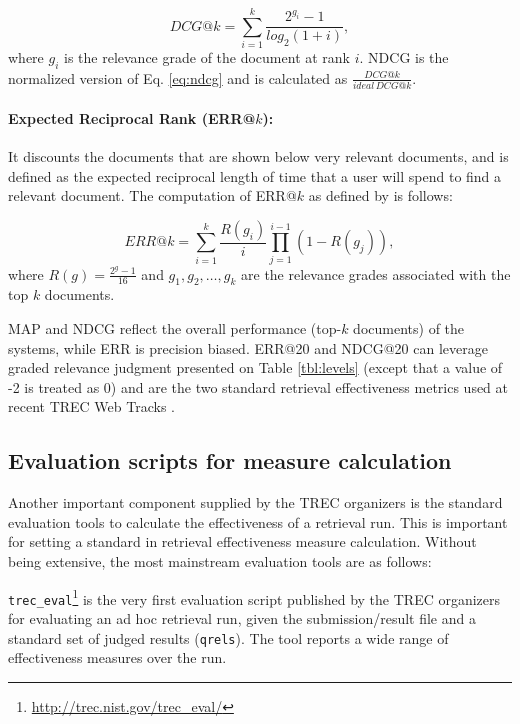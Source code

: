 \begin{equation} \label{eq:ndcg}
DCG@k = \sum\limits_{i=1}^k \frac{2^{g_i}-1}{log_2(1+i)},
\end{equation}
where $g_i$ is the relevance grade of the document at rank $i$.
NDCG is the normalized version of Eq. \ref{eq:ndcg} and is calculated as $\frac{DCG@k} {ideal \, DCG@k} $.

\paragraph{Expected Reciprocal Rank (ERR@$k$):} It discounts the documents that are shown below very relevant documents, and is defined as the expected reciprocal length of time that a user will spend to find a relevant document.
The computation of ERR@$k$ as defined by \citet*{err} is follows:
  
\begin{equation} \label{eq:err}
ERR@k = \sum\limits_{i=1}^k \frac{R(g_i)} {i} \prod\limits_{j=1}^{i-1}{(1-R(g_j))},
\end{equation}
where $R(g)=\frac{2^g-1}{16}$ and $g_1,g_2,\ldots,g_k$ are the relevance grades associated with the top $k$ documents.

MAP and NDCG reflect the overall performance (top-$k$ documents) of the systems, while ERR is precision biased.
ERR@20 and NDCG@20 can leverage graded relevance judgment presented on Table \ref{tbl:levels} (except that a value of -2 is treated as 0) and are the two standard retrieval effectiveness metrics used at recent TREC Web Tracks \citep{2014web}.

\subsection{Evaluation scripts for measure calculation}
Another important component supplied by the TREC organizers is the standard evaluation tools to calculate the effectiveness of a retrieval run.
This is important for setting a standard in retrieval effectiveness measure calculation.
Without being extensive, the most mainstream evaluation tools are as follows:

\texttt{trec\_eval}\footnote{\url{http://trec.nist.gov/trec_eval/}} is the very first evaluation script published by the TREC organizers for evaluating an ad hoc retrieval run, given the submission/result file and a standard set of judged results (\texttt{qrels}). The tool reports a wide range of effectiveness measures over the run.

